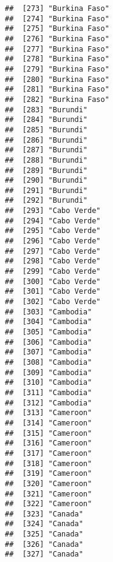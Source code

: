 \documentclass[]{article}
\begin{document}
\begin{verbatim}
##  [273] "Burkina Faso"                       
##  [274] "Burkina Faso"                       
##  [275] "Burkina Faso"                       
##  [276] "Burkina Faso"                       
##  [277] "Burkina Faso"                       
##  [278] "Burkina Faso"                       
##  [279] "Burkina Faso"                       
##  [280] "Burkina Faso"                       
##  [281] "Burkina Faso"                       
##  [282] "Burkina Faso"                       
##  [283] "Burundi"                            
##  [284] "Burundi"                            
##  [285] "Burundi"                            
##  [286] "Burundi"                            
##  [287] "Burundi"                            
##  [288] "Burundi"                            
##  [289] "Burundi"                            
##  [290] "Burundi"                            
##  [291] "Burundi"                            
##  [292] "Burundi"                            
##  [293] "Cabo Verde"                         
##  [294] "Cabo Verde"                         
##  [295] "Cabo Verde"                         
##  [296] "Cabo Verde"                         
##  [297] "Cabo Verde"                         
##  [298] "Cabo Verde"                         
##  [299] "Cabo Verde"                         
##  [300] "Cabo Verde"                         
##  [301] "Cabo Verde"                         
##  [302] "Cabo Verde"                         
##  [303] "Cambodia"                           
##  [304] "Cambodia"                           
##  [305] "Cambodia"                           
##  [306] "Cambodia"                           
##  [307] "Cambodia"                           
##  [308] "Cambodia"                           
##  [309] "Cambodia"                           
##  [310] "Cambodia"                           
##  [311] "Cambodia"                           
##  [312] "Cambodia"                           
##  [313] "Cameroon"                           
##  [314] "Cameroon"                           
##  [315] "Cameroon"                           
##  [316] "Cameroon"                           
##  [317] "Cameroon"                           
##  [318] "Cameroon"                           
##  [319] "Cameroon"                           
##  [320] "Cameroon"                           
##  [321] "Cameroon"                           
##  [322] "Cameroon"                           
##  [323] "Canada"                             
##  [324] "Canada"                             
##  [325] "Canada"                             
##  [326] "Canada"                             
##  [327] "Canada"                             

\end{verbatim}
\end{document}
